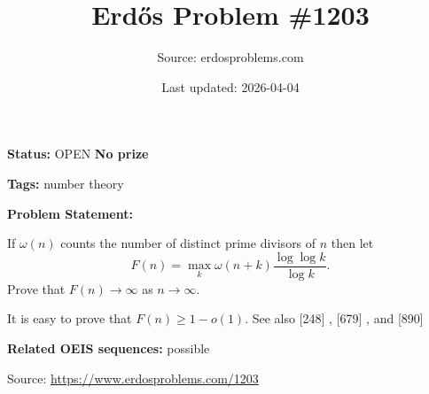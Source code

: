 \documentclass{article}
\title{Erd\H{o}s Problem \#1203}
\date{Last updated: 2026-04-04}
\author{Source: erdosproblems.com}
\begin{document}
\maketitle

\noindent\textbf{Status:} OPEN \quad \textbf{No prize}

\noindent\textbf{Tags:} number theory

\medskip

\noindent\textbf{Problem Statement:}

If $\omega(n)$ counts the number of distinct prime divisors of $n$ then let\[F(n)=\max_k \omega(n+k)\frac{\log\log k}{\log k}.\]Prove that $F(n)\to \infty$ as $n\to \infty$.




It is easy to prove that $F(n)\geq 1-o(1)$. See also [248] , [679] , and [890]

\noindent\textbf{Related OEIS sequences:} possible


\bigskip
\noindent\small{Source: \url{https://www.erdosproblems.com/1203}}
\end{document}
